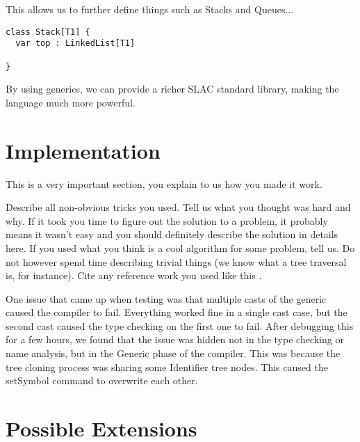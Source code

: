 \documentclass[nocopyrightspace,11pt,authoryear,preprint]{sigplanconf}
\begin{document}
This allows us to further define things such as Stacks and Queues...

\begin{lstlisting}
class Stack[T1] {
  var top : LinkedList[T1]
  
}
\end{lstlisting}

By using generics, we can provide a richer SLAC standard library, making
the language much more powerful.


\section{Implementation}

This is a very important section, you explain to us how you made it
work.

Describe all non-obvious tricks you used. Tell us what you thought was
hard and why. If it took you time to figure out the solution to a
problem, it probably means it wasn't easy and you should definitely
describe the solution in details here. If you used what you think is a
cool algorithm for some problem, tell us.  Do not however spend time
describing trivial things (we know what a tree traversal is, for
instance). Cite any reference work you used like this
\cite{TigerBook}.

One issue that came up when testing was that multiple casts of the
generic caused the compiler to fail.  Everything worked fine in a single
cast case, but the second cast caused the type checking on the first one to fail.
After debugging this for a few hours, we found that the issue was hidden not
in the type checking or name analysis, but in the Generic phase of the compiler.
This was because the tree cloning process was sharing some Identifier tree nodes.
This caused the setSymbol command to overwrite each other.


\section{Possible Extensions}
\end{document}
